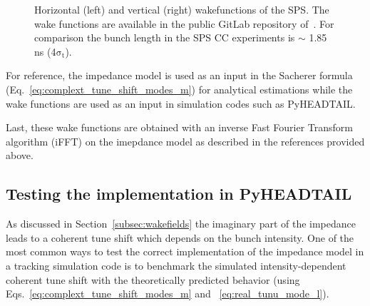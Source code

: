 \begin{figure}[!ht]
\begin{subfigure}[t]{0.45\textwidth}
    \end{subfigure}
    \hfill
     \caption{Horizontal (left) and vertical (right) wakefunctions of the SPS. The wake functions are available in the public GitLab repository of~\cite{sps_impedance_model_git}. For comparison the bunch length in the SPS CC experiments is $\sim$ 1.85\,ns (4$\mathrm{\sigma_t}$).} %
     \label{fig:sps_wakefunctions_model_H_V}
 \end{figure}


 For reference, the impedance model is used as an input in the Sacherer formula (Eq.~\eqref{eq:complext_tune_shift_modes_m}) for analytical estimations while the wake functions are used as an input in simulation codes such as PyHEADTAIL.

Last, these wake functions are obtained with an inverse Fast Fourier Transform algorithm (iFFT) on the imepdance model as described in the references provided above.



\subsection{Testing the implementation in PyHEADTAIL}\label{subsec:test_implementation_pyheatail}
As discussed in Section~\ref{subsec:wakefields} the imaginary part of the impedance leads to a coherent tune shift which depends on the bunch intensity. One of the most common ways to test the correct implementation of the impedance model in a tracking simulation code is to benchmark the simulated intensity-dependent coherent tune shift with the theoretically predicted behavior (using Eqs.~\eqref{eq:complext_tune_shift_modes_m} and ~\eqref{eq:real_tunu_mode_l}).

